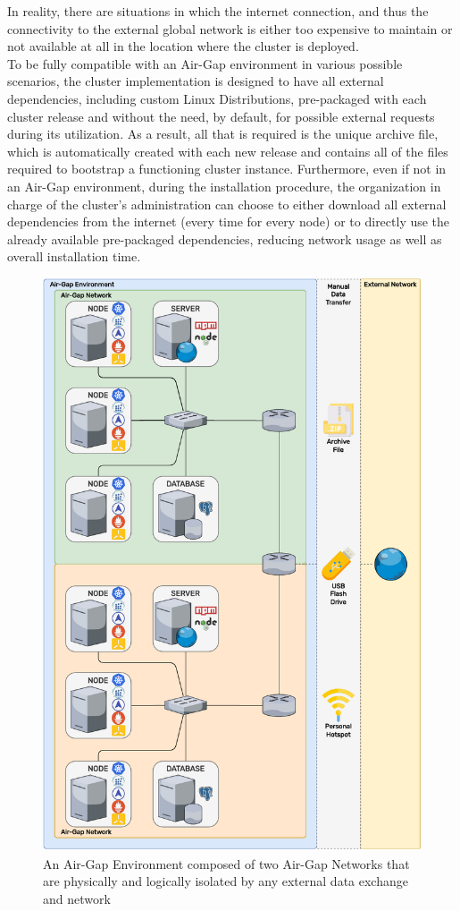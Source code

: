 In reality, there are situations in which the internet connection, and thus the
connectivity to the external global network is either too expensive to maintain
or not available at all in the location where the cluster is deployed. \\ %
To be fully compatible with an Air-Gap environment in various possible scenarios,
the cluster implementation is designed to have all external dependencies,
including custom Linux Distributions, pre-packaged with each cluster release and
without the need, by default, for possible external requests during its utilization.
As a result, all that is required is the unique archive file, which is
automatically created with each new release and contains all of the files
required to bootstrap a functioning cluster instance. Furthermore, even if not
in an Air-Gap environment, during the installation procedure, the organization
in charge of the cluster's administration can choose to either download all
external dependencies from the internet (every time for every node) or to
directly use the already available pre-packaged dependencies, reducing network usage
as well as overall installation time.

\begin{figure}[htbp]
  \centering
  \includegraphics[width=.65\textwidth]{images/implementation/airgap.pdf}
  \caption{An Air-Gap Environment composed of two Air-Gap Networks that are physically and logically isolated by any external data exchange and network}
  \label{fig:airgap}
\end{figure}

